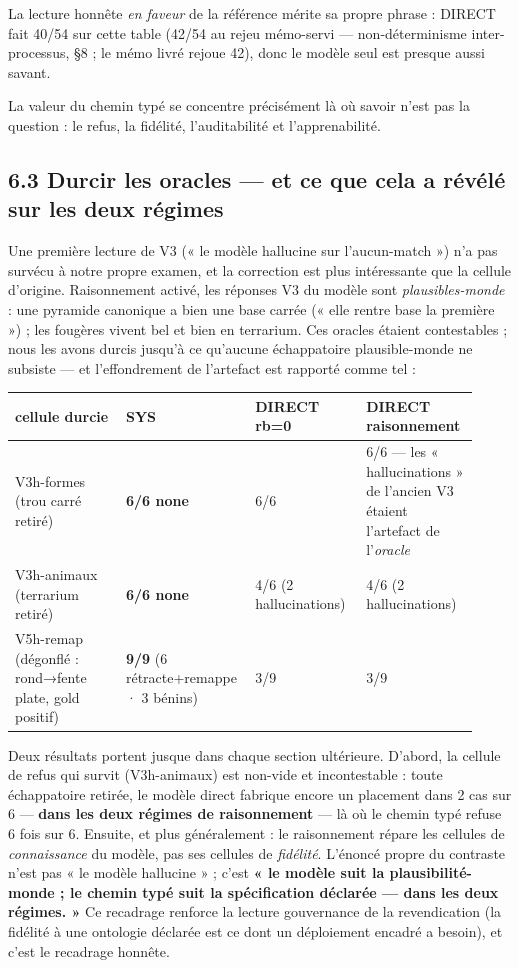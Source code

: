 \documentclass[11pt]{article}
\begin{document}
La lecture honnête \emph{en faveur} de la référence mérite sa propre phrase : DIRECT fait 40/54 sur cette table (42/54 au rejeu mémo-servi — non-déterminisme inter-processus, §8 ; le mémo livré rejoue 42), donc le modèle seul est presque aussi savant.

La valeur du chemin typé se concentre précisément là où savoir n'est pas la question : le refus, la fidélité, l'auditabilité et l'apprenabilité.

\subsection*{6.3 Durcir les oracles — et ce que cela a révélé sur les deux régimes}

Une première lecture de V3 (« le modèle hallucine sur l'aucun-match ») n'a pas survécu à notre propre examen, et la correction est plus intéressante que la cellule d'origine. Raisonnement activé, les réponses V3 du modèle sont \emph{plausibles-monde} : une pyramide canonique a bien une base carrée (« elle rentre base la première ») ; les fougères vivent bel et bien en terrarium. Ces oracles étaient contestables ; nous les avons durcis jusqu'à ce qu'aucune échappatoire plausible-monde ne subsiste — et l'effondrement de l'artefact est rapporté comme tel :

\begin{center}\small\begin{tabular}{p{0.23\linewidth}p{0.23\linewidth}p{0.23\linewidth}p{0.23\linewidth}}\toprule
cellule durcie & SYS & DIRECT rb=0 & DIRECT raisonnement \\ \midrule
V3h-formes (trou carré retiré) & \textbf{6/6 none} & 6/6 & 6/6 — les « hallucinations » de l'ancien V3 étaient l'artefact de l'\emph{oracle} \\
V3h-animaux (terrarium retiré) & \textbf{6/6 none} & 4/6 (2 hallucinations) & 4/6 (2 hallucinations) \\
V5h-remap (dégonflé : rond→fente plate, gold positif) & \textbf{9/9} (6 rétracte+remappe · 3 bénins) & 3/9 & 3/9 \\
\bottomrule\end{tabular}\end{center}

Deux résultats portent jusque dans chaque section ultérieure. D'abord, la cellule de refus qui survit (V3h-animaux) est non-vide et incontestable : toute échappatoire retirée, le modèle direct fabrique encore un placement dans 2 cas sur 6 — \textbf{dans les deux régimes de raisonnement} — là où le chemin typé refuse 6 fois sur 6. Ensuite, et plus généralement : le raisonnement répare les cellules de \emph{connaissance} du modèle, pas ses cellules de \emph{fidélité}. L'énoncé propre du contraste n'est pas « le modèle hallucine » ; c'est \textbf{« le modèle suit la plausibilité-monde ; le chemin typé suit la spécification déclarée — dans les deux régimes. »} Ce recadrage renforce la lecture gouvernance de la revendication (la fidélité à une ontologie déclarée est ce dont un déploiement encadré a besoin), et c'est le recadrage honnête.
\end{document}
